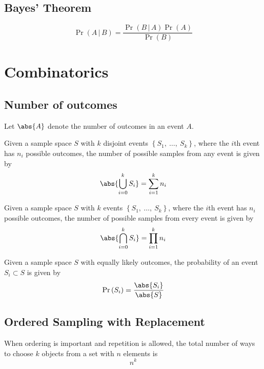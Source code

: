 \documentclass{article}
\begin{document}
\begin{multicols}{3}
    \subsection{Bayes' Theorem}
    \begin{equation*}
        \Pr{\left( A \,\vert\, B \right)} = \frac{\Pr{\left( B \,\vert\, A \right)}\Pr{\left( A \right)}}{\Pr{\left( B \right)}}
    \end{equation*}
    \section{Combinatorics}
    \subsection{Number of outcomes}
    Let \(\abs{A}\) denote the number of outcomes in an event \(A\).
    \begin{theorem}
        Given a sample space \(S\) with \(k\) disjoint events \({\left\{ S_1,\:\ldots,\:S_k \right\}}\),
        where the \(i\)th event has \(n_i\) possible outcomes,
        the number of possible samples from any event is given by
        \begin{equation*}
            \abs{\bigcup_{i = 0}^{k} S_i} = \sum_{i = 1}^k n_i
        \end{equation*}
    \end{theorem}
    \begin{theorem}
        Given a sample space \(S\) with \(k\) events \({\left\{ S_1,\:\ldots,\:S_k \right\}}\),
        where the \(i\)th event has \(n_i\) possible outcomes,
        the number of possible samples from every event is given by
        \begin{equation*}
            \abs{\bigcap_{i=0}^{k} S_i} = \prod_{i = 1}^k n_i
        \end{equation*}
    \end{theorem}
    \begin{theorem}
        Given a sample space \(S\) with equally likely outcomes, the probability
        of an event \(S_i \subset S\) is given by
        \begin{equation*}
            \Pr{\left( S_i \right)} = \frac{\abs{S_i}}{\abs{S}}
        \end{equation*}
    \end{theorem}
    \subsection{Ordered Sampling with Replacement}
    When ordering is important and repetition is allowed,
    the total number of ways to choose \(k\) objects from a set with \(n\) elements is
    \begin{equation*}
        n^k
    \end{equation*}

\end{multicols}
\end{document}
